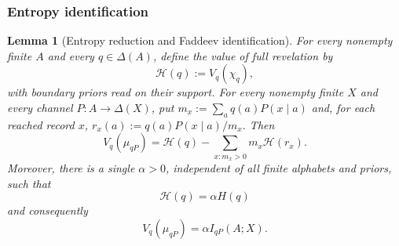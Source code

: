 \documentclass[11pt,a4paper]{article}
\newtheorem{lemma}[theorem]{Lemma}
\theoremstyle{definition}
\newcommand{\Sh}{H}
\newcommand{\1}{\mathbf 1}
\begin{document}
\subsubsection{Entropy identification}

\begin{lemma}[Entropy reduction and Faddeev identification]
\label{pt:lem:faddeevsketch}
For every nonempty finite $A$ and every $q\in\Delta(A)$, define the value of
full revelation by
\[
 \mathcal H(q):=V_q(\chi_q),
\]
with boundary priors read on their support.
For every nonempty finite $X$ and every channel $P:A\to\Delta(X)$, put
$m_x:=\sum_aq(a)P(x\mid a)$ and, for each reached record $x$,
$r_x(a):=q(a)P(x\mid a)/m_x$.  Then
\begin{equation}
 V_q(\mu_{qP})
 =\mathcal H(q)-\sum_{x:m_x>0}m_x\mathcal H(r_x).
\tag{ER}\label{pt:eq:entropy-reduction}
\end{equation}
Moreover, there is a single $\alpha>0$, independent of all finite alphabets
and priors, such that
\[
 \mathcal H(q)=\alpha\Sh(q)
\]
and consequently
\[
 V_q(\mu_{qP})=\alpha I_{qP}(A;X).
\tag{MI}\label{pt:eq:value-MI}
\]
\end{lemma}
\end{document}
